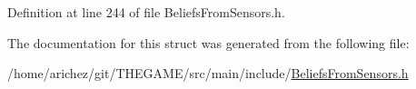 Definition at line 244 of file Beliefs\-From\-Sensors.\-h.



The documentation for this struct was generated from the following file\-:\begin{DoxyCompactItemize}
\item 
/home/arichez/git/\-T\-H\-E\-G\-A\-M\-E/src/main/include/\hyperlink{_beliefs_from_sensors_8h}{Beliefs\-From\-Sensors.\-h}\end{DoxyCompactItemize}
